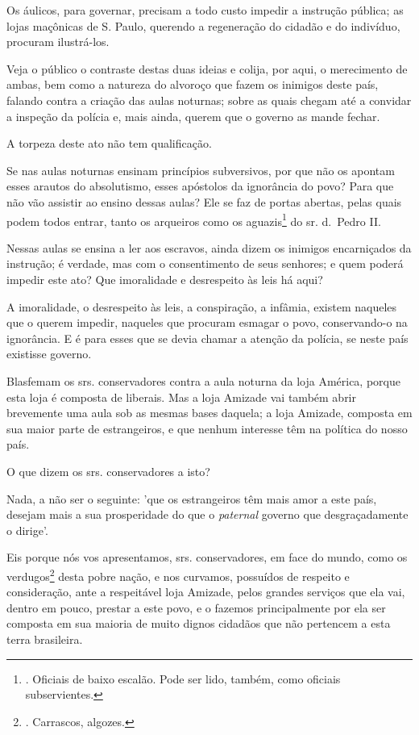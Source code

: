 Os áulicos, para governar, precisam a todo custo impedir a instrução
pública; as lojas maçônicas de S. Paulo, querendo a regeneração do
cidadão e do indivíduo, procuram ilustrá-los.

Veja o público o contraste destas duas ideias e colija, por aqui, o
merecimento de ambas, bem como a natureza do alvoroço que fazem os
inimigos deste país, falando contra a criação das aulas noturnas; sobre
as quais chegam até a convidar a inspeção da polícia e, mais ainda,
querem que o governo as mande fechar.

A torpeza deste ato não tem qualificação.

Se nas aulas noturnas ensinam princípios subversivos, por que não os
apontam esses arautos do absolutismo, esses apóstolos da ignorância do
povo? Para que não vão assistir ao ensino dessas aulas? Ele se faz de
portas abertas, pelas quais podem todos entrar, tanto os arqueiros como
os aguazis\footnote{. Oficiais de baixo escalão. Pode ser lido, também,
  como oficiais subservientes.} do sr. d.~Pedro II.

Nessas aulas se ensina a ler aos escravos, ainda dizem os inimigos
encarniçados da instrução; é verdade, mas com o consentimento de seus
senhores; e quem poderá impedir este ato? Que imoralidade e desrespeito
às leis há aqui?

A imoralidade, o desrespeito às leis, a conspiração, a infâmia, existem
naqueles que o querem impedir, naqueles que procuram esmagar o povo,
conservando-o na ignorância. E é para esses que se devia chamar a
atenção da polícia, se neste país existisse governo.

Blasfemam os srs. conservadores contra a aula noturna da loja América,
porque esta loja é composta de liberais. Mas a loja Amizade vai também
abrir brevemente uma aula sob as mesmas bases daquela; a loja Amizade,
composta em sua maior parte de estrangeiros, e que nenhum interesse têm
na política do nosso país.

O que dizem os srs. conservadores a isto?

Nada, a não ser o seguinte: 'que os estrangeiros têm mais amor a este
país, desejam mais a sua prosperidade do que o \emph{paternal} governo
que desgraçadamente o dirige'.

Eis porque nós vos apresentamos, srs. conservadores, em face do mundo,
como os verdugos\footnote{. Carrascos, algozes.} desta pobre nação, e
nos curvamos, possuídos de respeito e consideração, ante a respeitável
loja Amizade, pelos grandes serviços que ela vai, dentro em pouco,
prestar a este povo, e o fazemos principalmente por ela ser composta em
sua maioria de muito dignos cidadãos que não pertencem a esta terra
brasileira.


